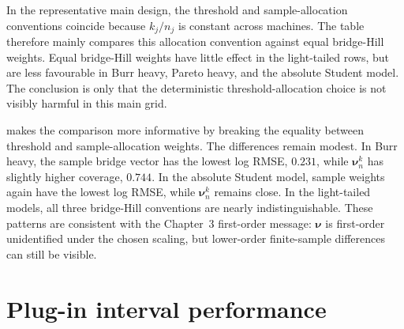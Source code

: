 In the representative main design, the threshold and sample-allocation
conventions coincide because \(k_j/n_j\) is constant across machines. The
table therefore mainly compares this allocation convention against equal
bridge-Hill weights. Equal bridge-Hill weights have little effect in the
light-tailed rows, but are less favourable in Burr heavy, Pareto heavy, and
the absolute Student model. The conclusion is only that the deterministic
threshold-allocation choice is not visibly harmful in this main grid.

 makes the comparison more informative by
breaking the equality between threshold and sample-allocation weights. The
differences remain modest. In Burr heavy, the sample bridge vector has the
lowest log RMSE, \(0.231\), while \(\bm\nu_n^k\) has slightly higher coverage,
\(0.744\). In the absolute Student model, sample weights again have the
lowest log RMSE, while \(\bm\nu_n^k\) remains close. In the light-tailed
models, all three bridge-Hill conventions are nearly indistinguishable. These
patterns are consistent with the Chapter~3 first-order message:
\(\bm\nu\) is
first-order unidentified under the chosen scaling, but lower-order
finite-sample differences can still be visible.

\begin{table}[htbp]
\centering
\small
\caption{Sensitivity to deterministic bridge-Hill weights in the representative
main design. The pooled-Weissman weights are fixed at the
variance choice of \textcite{DaouiaPadoanStupfler2021}.}
\label{tab:sim:nu}
\begingroup
\setlength{\tabcolsep}{4pt}

\endgroup
\end{table}

\begin{table}[htbp]
\centering
\small
\caption{Sensitivity to deterministic bridge-Hill weights under heterogeneous
local threshold fractions. The aggregate \(k/n\) is kept close to \(0.05\), and
the pooled-Weissman weights are fixed at the variance choice of
\textcite{DaouiaPadoanStupfler2021}.}
\label{tab:sim:nu-heterogeneous}
\begingroup
\setlength{\tabcolsep}{4pt}

\endgroup
\end{table}

\section{Plug-in interval performance}
\label{sec:sim:intervals}

